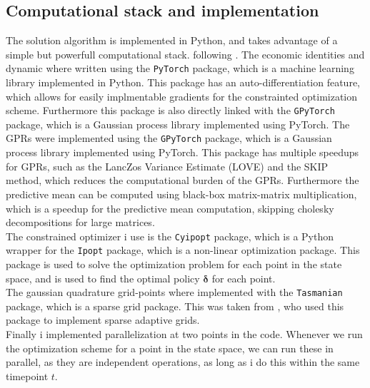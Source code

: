 \documentclass[11pt]{article}
\begin{document}
\subsection{Computational stack and implementation} \label{Subsection: Computational_stack}
The solution algorithm is implemented in Python, and takes advantage of a simple but powerfull computational stack. following \autocite{Scheidegger2023}.
The economic identities and dynamic where written using the \texttt{PyTorch} package, which is a machine learning library implemented in Python.
This package has an auto-differentiation feature, which allows for easily implmentable gradients for the constrainted optimization scheme.
Furthermore this package is also directly linked with the \texttt{GPyTorch} package, which is a Gaussian process library implemented using PyTorch.
The \ac{GPR}s were implemented using the \texttt{GPyTorch} package, which is a Gaussian process library implemented using PyTorch.
This package has multiple speedups for \ac{GPR}s, such as the LancZos Variance Estimate (LOVE) and the SKIP method, which reduces the computational burden of the \ac{GPR}s.
Furthermore the predictive mean can be computed using black-box matrix-matrix multiplication, which is a speedup for the predictive mean computation,
skipping cholesky decompositions for large matrices.\\
The constrained optimizer i use is the \texttt{Cyipopt} package, which is a Python wrapper for the \texttt{Ipopt} package, which is a non-linear optimization package.
This package is used to solve the optimization problem for each point in the state space, and is used to find the optimal policy $\boldsymbol{\delta}$ for each point.\\
The gaussian quadrature grid-points where implemented with the \texttt{Tasmanian} package, which is a sparse grid package.
This was taken from \autocite{Schober2022}, who used this package to implement sparse adaptive grids.\\
Finally i implemented parallelization at two points in the code. Whenever we run the optimization scheme for a point in the state space, we can run these in parallel,
as they are independent operations, as long as i do this within the same timepoint $t$. 



\ifdefined\COMPILINGMAIN
\else
\end{document}
